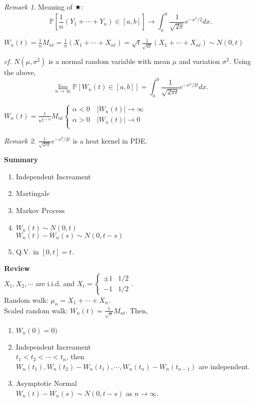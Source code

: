 \documentclass[12pt]{report}
\renewcommand{\P}{\mathbb{P}}
\renewcommand{\1}{\mathbb{1}}
\theoremstyle{break}
\theoremstyle{newdef}
\theoremstyle{remark}
\newtheorem*{rem}{Remark} %
\begin{document}
\begin{rem}
Meaning of $\bigstar$:
$$\P\left[\frac{1}{n} (Y_1 + \cdots + Y_n) \in [a,b]\right] \rightarrow \int_a^b \frac{1}{\sqrt{2\pi}} e^{-x^2/2}dx.$$
\end{rem}


$W_n(t) = \frac{1}{n} M_{nt} = \frac{1}{n} (X_1 + \cdots + X_{nt})
= \sqrt{t} \frac{1}{\sqrt{nt}} (X_1 + \cdots + X_{nt}) \sim N(0,t)$



\textit{cf.} $N(\mu, \sigma^2)$ is a normal random variable with mean $\mu$ and variation $\sigma^2$.
Using the above,
$$
\lim_{n\rightarrow\infty} \P\left[ W_n(t) \in [a,b]\right] = \int_a^b \frac{1}{\sqrt{2\pi t}} e^{-x^2/2t}dx.
$$

$
W_n(t) = \frac{1}{n^{\frac{1}{2} + \alpha}} M_{nt}
\begin{cases}
\alpha < 0 \quad |W_n(t)| \rightarrow \infty\\
\alpha > 0 \quad |W_n(t)| \rightarrow 0\\
\end{cases}
$


\begin{rem}
$\frac{1}{\sqrt{2\pi t}}e^{-x^2/2t}$ is a heat kernel in PDE.
\end{rem}

\vspace{5mm}

\textbf{Summary}
\begin{enumerate}
\item Independent Increament
\item Martingale
\item Markov Process
\item $W_n(t) \sim N(0,t)$\\
$W_n(t) - W_n(s) \sim N(0, t-s)$
\item Q.V. in $[0,t] = t$.
\end{enumerate}



\textbf{Review}\\
$X_1, X_2, \cdots$ are i.i.d. and
$X_i = \begin{cases} \pm 1 & 1/2 \\ -1 & 1/2\end{cases}$.\\
Random walk: $\mu_n = X_1 + \cdots + X_n$.\\
Scaled random walk: $W_n(t) = \frac{1}{\sqrt n}M_{nt}$. Then,
\begin{enumerate}
\item $W_n(0)=0)$
\item Independent Increament\\
$t_1 < t_2 < \cdots < t_n$, then
$W_n(t_1), W_n(t_2) - W_n(t_1), \cdots, W_n(t_n) - W_n(t_{n-1})$ are independent.
\item Asymptotic Normal\\
$W_n(t) - W_n(s) \sim N(0,t-s)$ as $n\rightarrow\infty$.
\end{enumerate}
\end{document}
